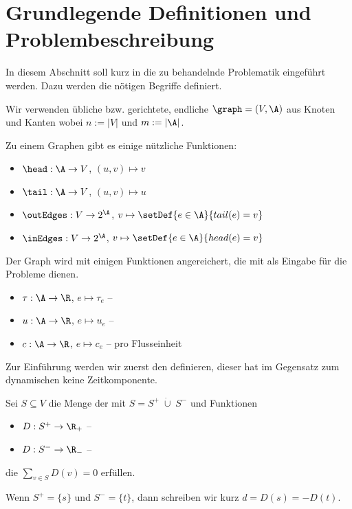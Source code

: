 
\section{Grundlegende Definitionen und Problembeschreibung}\label{sec:problem}
In diesem Abschnitt soll kurz in die zu behandelnde Problematik eingeführt
werden. Dazu werden die nötigen Begriffe definiert.

\begin{definition}
    Wir verwenden übliche  bzw. gerichtete, endliche 
    $\graph = (V, \A)$ aus Knoten und Kanten wobei $n := |V|$ und $m := |\A|$.
    
    Zu einem Graphen gibt es einige nützliche Funktionen:
    \begin{itemize}
        \item $\head : \A \rightarrow V$, $(u,v) \mapsto v$
        \item $\tail : \A \rightarrow V$, $(u,v) \mapsto u$
        \item $\outEdges : V \rightarrow 2^\A$, $v \mapsto \setDef{e \in \A}{tail(e) = v}$
        \item $\inEdges : V \rightarrow 2^\A$, $v \mapsto \setDef{e \in \A}{head(e) = v}$
    \end{itemize}
    
    Der Graph wird mit einigen Funktionen angereichert, die mit als Eingabe
    für die Probleme dienen.
    \begin{itemize}
        \item $\tau : \A \rightarrow \R$, $e \mapsto \tau_e$ -- 
        \item $u : \A \rightarrow \R$, $e \mapsto u_e$ -- 
        \item $c : \A \rightarrow \R$, $e \mapsto c_e$ --  pro Flusseinheit
    \end{itemize}
\end{definition}

Zur Einführung werden wir zuerst den  definieren, dieser
hat im Gegensatz zum dynamischen keine Zeitkomponente.

\begin{definition}
    Sei $S \subseteq V$ die Menge der  mit $S = S^+ \;\dot{\cup}\; S^-$
    und Funktionen
    \begin{itemize}
        \item $D : S^+ \rightarrow \R_+$ -- 
        \item $D : S^- \rightarrow \R_-$ -- 
    \end{itemize}
    die $\sum_{v \in S} D(v) = 0$ erfüllen.
    
    Wenn $S^+ = \{s\}$ und $S^- = \{t\}$, dann schreiben wir kurz $d = D(s) = -D(t)$.
\end{definition}

